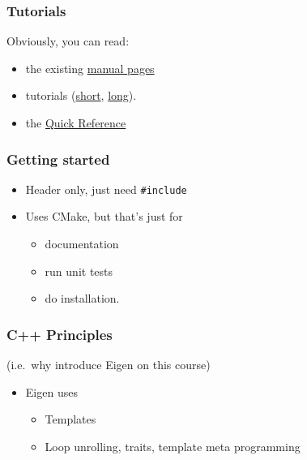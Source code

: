 \subsubsection{Tutorials}\label{tutorials}

Obviously, you can read:

\begin{itemize}
\itemsep1pt\parskip0pt
\item
  the existing \href{http://eigen.tuxfamily.org/dox/index.html}{manual
  pages}
\item
  tutorials
  (\href{http://eigen.tuxfamily.org/dox/GettingStarted.html}{short},
  \href{http://eigen.tuxfamily.org/dox/group__TutorialMatrixClass.html}{long}).
\item
  the
  \href{http://eigen.tuxfamily.org/dox/group__QuickRefPage.html}{Quick
  Reference}
\end{itemize}

\subsubsection{Getting started}\label{getting-started}

\begin{itemize}
\itemsep1pt\parskip0pt
\item
  Header only, just need \texttt{\#include}
\item
  Uses CMake, but that's just for

  \begin{itemize}
  \itemsep1pt\parskip0pt
  \item
    documentation
  \item
    run unit tests
  \item
    do installation.
  \end{itemize}
\end{itemize}

\subsubsection{C++ Principles}\label{c-principles}

(i.e.~why introduce Eigen on this course)

\begin{itemize}
\itemsep1pt\parskip0pt
\item
  Eigen uses

  \begin{itemize}
  \itemsep1pt\parskip0pt
  \item
    Templates
  \item
    Loop unrolling, traits, template meta programming
  \end{itemize}
\end{itemize}

